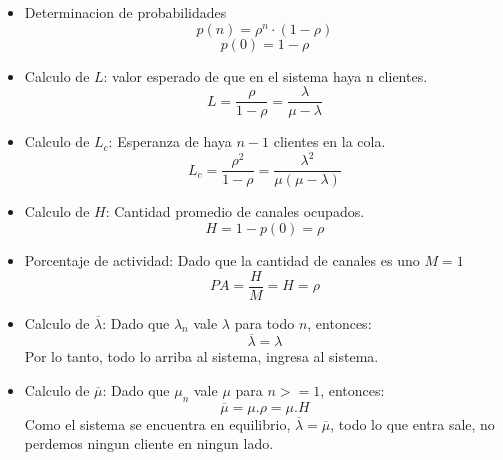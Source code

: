 \documentclass{article}
\begin{document}
\begin{itemize}
    \item Determinacion de probabilidades
        \begin{equation} \label{eu_eqn}
            p(n) = \rho^n \cdot (1 - \rho)
        \end{equation}
        \begin{equation} \label{eu_eqn}
            p(0) = 1-\rho
        \end{equation}
    \item Calculo de \(L\): valor esperado de que en el sistema haya n clientes.
        \begin{equation} \label{eu_eqn}
            L = \frac{\rho}{1-\rho} = \frac{\lambda}{\mu-\lambda}
        \end{equation}
    \item Calculo de \(L_c\): Esperanza de haya \(n-1\) clientes en la cola.
        \begin{equation} \label{eu_eqn}
            L_c = \frac{\rho^2}{1-\rho} = \frac{\lambda^2}{\mu(\mu-\lambda)}
        \end{equation}
    \item Calculo de \(H\): Cantidad promedio de canales ocupados.
        \begin{equation} \label{eu_eqn}
            H = 1 - p(0) = \rho
        \end{equation}
    \item Porcentaje de actividad: 
        Dado que la cantidad de canales es uno \(M=1\)
        \begin{equation} \label{eu_eqn}
            PA = \frac{H}{M} = H = \rho
        \end{equation}
    \item Calculo de \(\overline{\lambda}\): 
        Dado que \(\lambda_n\) vale \(\lambda\) para todo \(n\), entonces:
        \begin{equation} \label{eu_eqn}
            \overline{\lambda} = \lambda
        \end{equation}  
        Por lo tanto, todo lo arriba al sistema, ingresa al sistema.
    \item Calculo de \(\overline{\mu}\): 
        Dado que \(\mu_n\) vale \(\mu\) para \(n>=1\), entonces:
        \begin{equation} \label{eu_eqn}
            \overline{\mu} = \mu.\rho = \mu.H
        \end{equation}  
        Como el sistema se encuentra en equilibrio, \(\overline{\lambda} = \overline{\mu}\), todo lo que entra sale, no perdemos ningun cliente en ningun lado.

\end{itemize}
\end{document}

